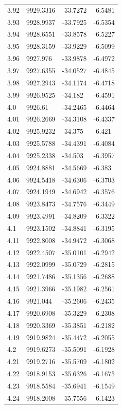\begin{table}[H]
\begin{tabular}{llll}
3.92 & 9929.3316 & -33.7272 & -6.5481 \\
3.93 & 9928.9937 & -33.7925 & -6.5354 \\
3.94 & 9928.6551 & -33.8578 & -6.5227 \\
3.95 & 9928.3159 & -33.9229 & -6.5099 \\
3.96 & 9927.976 & -33.9878 & -6.4972 \\
3.97 & 9927.6355 & -34.0527 & -6.4845 \\
3.98 & 9927.2943 & -34.1174 & -6.4718 \\
3.99 & 9926.9525 & -34.182 & -6.4591 \\
4.0 & 9926.61 & -34.2465 & -6.4464 \\
4.01 & 9926.2669 & -34.3108 & -6.4337 \\
4.02 & 9925.9232 & -34.375 & -6.421 \\
4.03 & 9925.5788 & -34.4391 & -6.4084 \\
4.04 & 9925.2338 & -34.503 & -6.3957 \\
4.05 & 9924.8881 & -34.5669 & -6.383 \\
4.06 & 9924.5418 & -34.6306 & -6.3703 \\
4.07 & 9924.1949 & -34.6942 & -6.3576 \\
4.08 & 9923.8473 & -34.7576 & -6.3449 \\
4.09 & 9923.4991 & -34.8209 & -6.3322 \\
4.1 & 9923.1502 & -34.8841 & -6.3195 \\
4.11 & 9922.8008 & -34.9472 & -6.3068 \\
4.12 & 9922.4507 & -35.0101 & -6.2942 \\
4.13 & 9922.0999 & -35.0729 & -6.2815 \\
4.14 & 9921.7486 & -35.1356 & -6.2688 \\
4.15 & 9921.3966 & -35.1982 & -6.2561 \\
4.16 & 9921.044 & -35.2606 & -6.2435 \\
4.17 & 9920.6908 & -35.3229 & -6.2308 \\
4.18 & 9920.3369 & -35.3851 & -6.2182 \\
4.19 & 9919.9824 & -35.4472 & -6.2055 \\
4.2 & 9919.6273 & -35.5091 & -6.1928 \\
4.21 & 9919.2716 & -35.5709 & -6.1802 \\
4.22 & 9918.9153 & -35.6326 & -6.1675 \\
4.23 & 9918.5584 & -35.6941 & -6.1549 \\
4.24 & 9918.2008 & -35.7556 & -6.1423 \\

\end{tabular}
\end{table}
